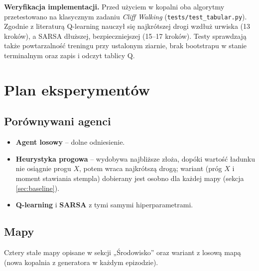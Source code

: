 \documentclass[11pt,a4paper]{article}
\begin{document}
\textbf{Weryfikacja implementacji.} Przed użyciem w kopalni oba algorytmy
przetestowano na klasycznym zadaniu \emph{Cliff Walking} \cite{sutton}
(\texttt{tests/test\_tabular.py}). Zgodnie z literaturą Q-learning nauczył się
najkrótszej drogi wzdłuż urwiska (13 kroków), a SARSA dłuższej, bezpieczniejszej
(15--17 kroków). Testy sprawdzają także powtarzalność treningu przy ustalonym
ziarnie, brak bootstrapu w stanie terminalnym oraz zapis i odczyt tablicy Q.

\section{Plan eksperymentów}
\subsection{Porównywani agenci}
\begin{itemize}
  \item \textbf{Agent losowy} -- dolne odniesienie.
  \item \textbf{Heurystyka progowa} -- wydobywa najbliższe złoża, dopóki wartość
  ładunku nie osiągnie progu $X$, potem wraca najkrótszą drogą; wariant
  (próg $X$ i moment stawiania stempla) dobierany jest osobno dla każdej mapy
  (sekcja \ref{sec:baseline}).
  \item \textbf{Q-learning} i \textbf{SARSA} z tymi samymi hiperparametrami.
\end{itemize}

\subsection{Mapy}
Cztery stałe mapy opisane w sekcji „Środowisko” oraz wariant z losową mapą
(nowa kopalnia z generatora w każdym epizodzie).
\end{document}
